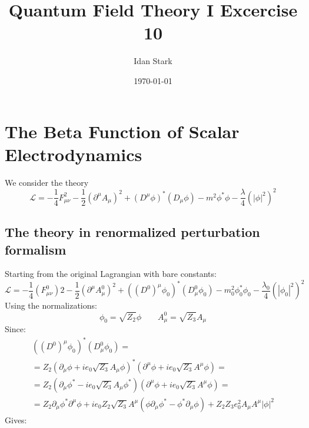 \documentclass{article}
\title{Quantum Field Theory I Excercise 10}
\author{Idan Stark}
\date{\today}
\begin{document}
\maketitle

\section{The Beta Function of Scalar Electrodynamics}
We consider the theory
\begin{equation}
    \mathcal{L} = -\frac{1}{4}F_{\mu\nu}^2 - \frac{1}{2}\left(\partial^\mu A_\mu\right)^2 + \left(D^\mu \phi\right)^*\left(D_\mu \phi\right) - m^2 \phi^*\phi - \frac{\lambda}{4}\left(\left|\phi\right|^2\right)^2
\end{equation}

\subsection{The theory in renormalized perturbation formalism}
Starting from the original Lagrangian with bare constants:
\begin{equation}
    \mathcal{L} = -\frac{1}{4}(F_{\mu\nu}^0)2 - \frac{1}{2}\left(\partial^\mu A^0_\mu\right)^2 + \left((D^0)^\mu \phi_0\right)^*\left(D^0_\mu \phi_0\right) - m_0^2 \phi_0^*\phi_0 - \frac{\lambda_0}{4}\left(\left|\phi_0\right|^2\right)^2
\end{equation}
Using the normalizations:
\begin{equation}
    \phi_0 = \sqrt{Z_2} \phi
    \qquad
    A^0_\mu = \sqrt{Z_3} A_\mu
\end{equation}
Since:
\begin{equation}
\begin{gathered}
    \left((D^0)^\mu \phi_0\right)^*\left(D^0_\mu \phi_0\right) = \\ =
    Z_2\left(\partial_\mu \phi + i e_0 \sqrt{Z_3} A_\mu \phi\right)^*\left(\partial^\mu \phi + i e_0 \sqrt{Z_3} A^\mu \phi\right) = \\ =
    Z_2\left(\partial_\mu \phi^* - i e_0 \sqrt{Z_3} A_\mu \phi^*\right)\left(\partial^\mu \phi + i e_0 \sqrt{Z_3} A^\mu \phi\right) = \\ =
    Z_2\partial_\mu \phi^* \partial^\mu \phi +
    i e_0 Z_2 \sqrt{Z_3} A^\mu \left(\phi \partial_\mu \phi^* - \phi^* \partial_\mu \phi \right) +
    Z_2 Z_3 e_0^2 A_\mu A^\mu |\phi|^2
\end{gathered}
\end{equation}
Gives:
\end{document}
